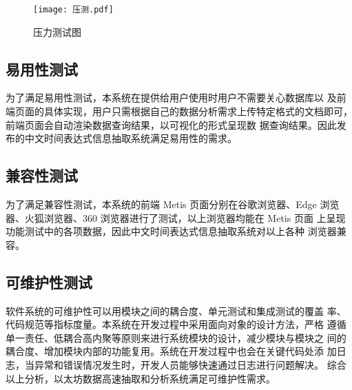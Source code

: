 \begin{figure}[h]
    \centering
    \texttt{[image: 压测.pdf]}
    \caption{压力测试图}
    \label{fig:pressure}
\end{figure}


\subsection{易用性测试}

为了满足易用性测试，本系统在提供给用户使用时用户不需要关心数据库以
及前端页面的具体实现，用户只需根据自己的数据分析需求上传特定格式的文档即可，前端页面会自动渲染数据查询结果，以可视化的形式呈现数
据查询结果。因此发布的中文时间表达式信息抽取系统满足易用性的需求。

\subsection{兼容性测试}

为了满足兼容性测试，本系统的前端 Metis 页面分别在谷歌浏览器、Edge
浏览器、火狐浏览器、360 浏览器进行了测试，以上浏览器均能在 Metis 页面
上呈现功能测试中的各项数据，因此中文时间表达式信息抽取系统对以上各种
浏览器兼容。

\subsection{可维护性测试}

软件系统的可维护性可以用模块之间的耦合度、单元测试和集成测试的覆盖
率、代码规范等指标度量。本系统在开发过程中采用面向对象的设计方法，严格
遵循单一责任、低耦合高内聚等原则来进行系统模块的设计，减少模块与模块之
间的耦合度、增加模块内部的功能复用。系统在开发过程中也会在关键代码处添
加日志，当异常和错误情况发生时，开发人员能够快速通过日志进行问题解决。
综合以上分析，以太坊数据高速抽取和分析系统满足可维护性需求。
